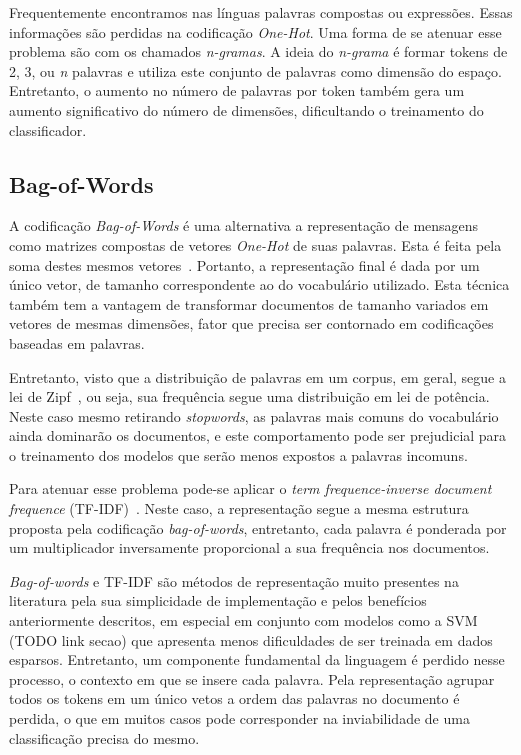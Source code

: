 
Frequentemente encontramos nas línguas palavras compostas ou expressões.
Essas informações são perdidas na codificação \textit{One-Hot}.
Uma forma de se atenuar esse problema são com os chamados \textit{n-gramas}.
A ideia do \textit{n-grama} é formar tokens de 2, 3, ou \textit{n} palavras e
utiliza este conjunto de palavras como dimensão do espaço.
Entretanto, o aumento no número de palavras por token também gera um aumento
significativo do número de dimensões, dificultando o treinamento do
classificador.

\subsection{Bag-of-Words}

A codificação \textit{Bag-of-Words} é uma alternativa a representação de
mensagens como matrizes compostas de vetores \textit{One-Hot} de suas palavras.
Esta é feita pela soma destes mesmos vetores~\cite{manning10}.
Portanto, a representação final é dada por um único vetor, de tamanho
correspondente ao do vocabulário utilizado.
Esta técnica também tem a vantagem de transformar documentos de tamanho variados
em vetores de mesmas dimensões, fator que precisa ser contornado em codificações
baseadas em palavras.


Entretanto, visto que a distribuição de palavras em um corpus, em geral, segue a
lei de Zipf~\cite{powers98}, ou seja, sua frequência segue uma distribuição em
lei de potência.
Neste caso mesmo retirando \textit{stopwords}, as palavras mais comuns do
vocabulário ainda dominarão os documentos, e este comportamento pode ser
prejudicial para o treinamento dos modelos que serão menos expostos a palavras
incomuns.


Para atenuar esse problema pode-se aplicar o \textit{term frequence-inverse
document frequence} (TF-IDF)~\cite{salton88}.
Neste caso, a representação segue a mesma estrutura proposta pela codificação
\textit{bag-of-words}, entretanto, cada palavra é ponderada por um multiplicador
inversamente proporcional a sua frequência nos documentos.


\textit{Bag-of-words} e TF-IDF são métodos de representação muito presentes na
literatura pela sua simplicidade de implementação e pelos benefícios
anteriormente descritos, em especial em conjunto com modelos como a SVM (TODO
link secao) que apresenta menos dificuldades de ser treinada em dados esparsos.
Entretanto, um componente fundamental da linguagem é perdido nesse processo, o
contexto em que se insere cada palavra.
Pela representação agrupar todos os tokens em um único vetos a ordem das
palavras no documento é perdida, o que em muitos casos pode corresponder na
inviabilidade de uma classificação precisa do mesmo.

